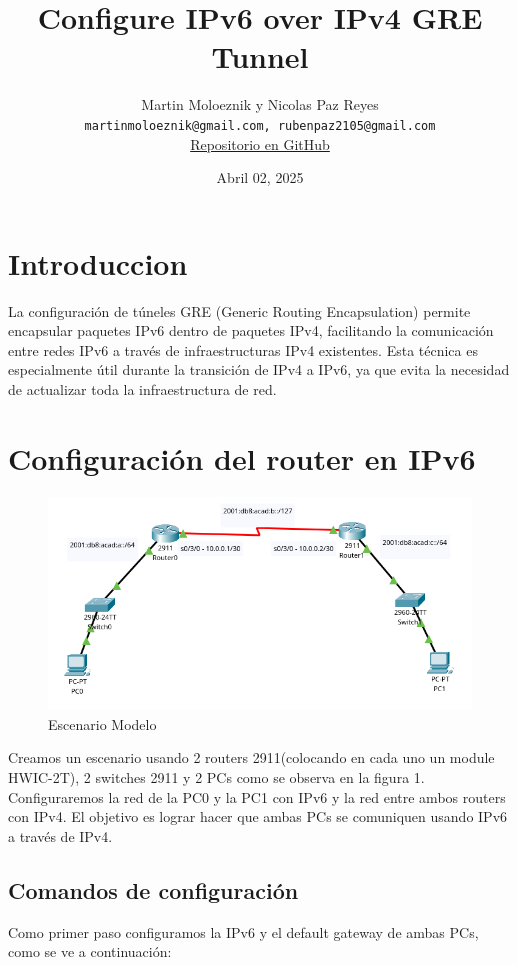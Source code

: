 \documentclass[a4paper,12pt]{article}
\title{\textbf{Configure IPv6 over IPv4 GRE Tunnel}}
\author{
    \begin{tabular}{c}
        Martin Moloeznik y Nicolas Paz Reyes \\
        \texttt{martinmoloeznik@gmail.com, rubenpaz2105@gmail.com} \\
        \href{https://github.com/N1C0-P4Z/IPv6-over-IPv4-GRE-Tunnels}{Repositorio en GitHub}
    \end{tabular}
}
\date{Abril 02, 2025}
\begin{document}
\maketitle

\section{Introduccion}
La configuración de túneles GRE (Generic Routing Encapsulation) permite encapsular paquetes IPv6 dentro de paquetes IPv4, facilitando la comunicación entre redes IPv6 a través de infraestructuras IPv4 existentes. Esta técnica es especialmente útil durante la transición de IPv4 a IPv6, ya que evita la necesidad de actualizar toda la infraestructura de red.
\section{Configuración del router en IPv6}
\begin{figure}[h]
    \centering
    \includegraphics[width=1\textwidth]{imagenes/lab1.png}
    \caption{Escenario Modelo}
  \end{figure}
\FloatBarrier

Creamos un escenario usando 2 routers 2911(colocando en cada uno un module HWIC-2T), 2 switches 2911 y 2 PCs como se observa en la figura 1. Configuraremos la red de la PC0 y la PC1 con IPv6 y la red entre ambos routers con IPv4. El objetivo es lograr hacer que ambas PCs se comuniquen usando IPv6 a través de IPv4.\\
\subsection{Comandos de configuración}

Como primer paso configuramos la IPv6 y el default gateway de ambas PCs, como se ve a continuación:\\
\end{document}
